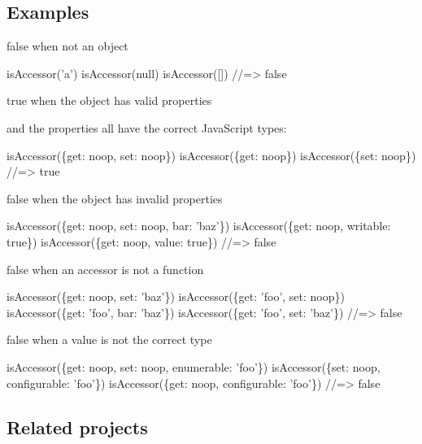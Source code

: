 \subsection*{Examples}

{\ttfamily false} when not an object


\begin{DoxyCode}
isAccessor('a')
isAccessor(null)
isAccessor([])
//=> false
\end{DoxyCode}


{\ttfamily true} when the object has valid properties

and the properties all have the correct Java\+Script types\+:


\begin{DoxyCode}
isAccessor(\{get: noop, set: noop\})
isAccessor(\{get: noop\})
isAccessor(\{set: noop\})
//=> true
\end{DoxyCode}


{\ttfamily false} when the object has invalid properties


\begin{DoxyCode}
isAccessor(\{get: noop, set: noop, bar: 'baz'\})
isAccessor(\{get: noop, writable: true\})
isAccessor(\{get: noop, value: true\})
//=> false
\end{DoxyCode}


{\ttfamily false} when an accessor is not a function


\begin{DoxyCode}
isAccessor(\{get: noop, set: 'baz'\})
isAccessor(\{get: 'foo', set: noop\})
isAccessor(\{get: 'foo', bar: 'baz'\})
isAccessor(\{get: 'foo', set: 'baz'\})
//=> false
\end{DoxyCode}


{\ttfamily false} when a value is not the correct type


\begin{DoxyCode}
isAccessor(\{get: noop, set: noop, enumerable: 'foo'\})
isAccessor(\{set: noop, configurable: 'foo'\})
isAccessor(\{get: noop, configurable: 'foo'\})
//=> false
\end{DoxyCode}


\subsection*{Related projects}


